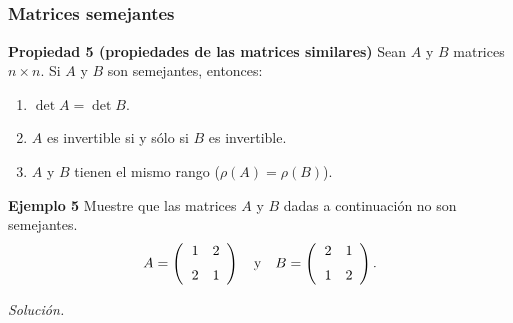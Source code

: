 \subsection{}
%
\begin{frame}\frametitle{Matrices semejantes}

\begin{prop}{\textbf{Propiedad 5 (propiedades de las matrices similares)}}
	\justifying
	Sean $A$ y $B$ matrices $n\times n$. Si $A$ y $B$ son semejantes, entonces:
	\begin{enumerate}[$a$]
		\justifying		
		\item $\det A = \det B$.
		\item $A$ es invertible si y sólo si $B$ es invertible.
		\item $A$ y $B$ tienen el mismo rango ($\rho(A)=\rho(B)$).
	\end{enumerate}
\end{prop}

\begin{ej}{\textbf{Ejemplo 5}}
	\justifying
	Muestre que las matrices $A$ y $B$ dadas a continuación no son semejantes.
	\[
	A = 
	\left( 
	\begin{array}{@{\hspace{1\tabcolsep}}rr}	
	1 & 2 \\[2mm] 
	2 & 1
	\end{array} 
	\right)
	\quad \text{y} \quad
	B = 
	\left( 
	\begin{array}{@{\hspace{1\tabcolsep}}rr}	
	2 & 1 \\[2mm] 
	1 & 2
	\end{array} 
	\right).
	\]
\end{ej}
\textit{Solución.}

\end{frame}
